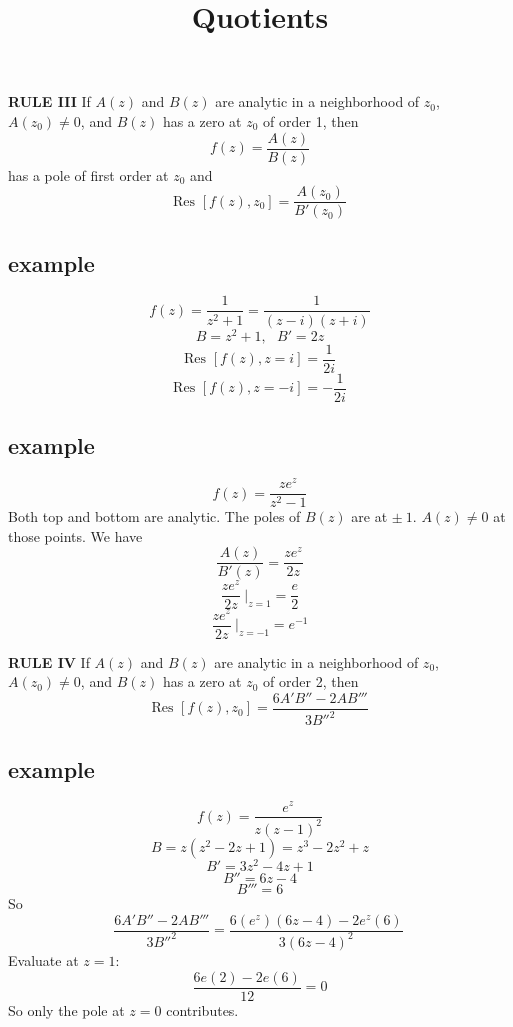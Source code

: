 \documentclass[11pt, oneside]{article}
\title{Quotients}
\date{}
\begin{document}
\maketitle
\Large


\textbf{RULE III}  If $A(z)$ and $B(z)$ are analytic in a neighborhood of $z_0$, $A(z_0) \ne 0$, and $B(z)$ has a zero at $z_0$ of order 1, then
\[ f(z) = \frac{A(z)}{B(z)} \]
has a pole of first order at $z_0$ and
\[ \text{Res } [f(z),z_0] = \frac{A(z_0)}{B'(z_0)} \]
\subsection*{example}
\[ f(z) = \frac{1}{z^2 + 1} = \frac{1}{(z - i)(z + i)} \]
\[ B = z^2 + 1, \ \ \ B' = 2z \]
\[ \text{Res } [f(z),z=i] = \frac{1}{2i} \]
\[ \text{Res } [f(z),z=-i] = -\frac{1}{2i} \]

\subsection*{example}
\[ f(z) = \frac{z e^z}{z^2 - 1} \]
Both top and bottom are analytic.  The poles of $B(z)$ are at $\pm \ 1$.  $A(z) \ne 0$ at those points.  We have 
\[ \frac{A(z)}{B'(z)} = \frac{z e^z}{2z} \]
\[ \frac{z e^z}{2z} \ \bigg |_{z=1} = \frac{e}{2} \]
\[ \frac{z e^z}{2z} \ \bigg |_{z=-1} = e^{-1} \]

\textbf{RULE IV}  If $A(z)$ and $B(z)$ are analytic in a neighborhood of $z_0$, $A(z_0) \ne 0$, and $B(z)$ has a zero at $z_0$ of order 2, then
\[ \text{Res } [f(z),z_0] = \frac{6A' B'' - 2AB'''}{3B''^2} \]

\subsection*{example}
\[ f(z) = \frac{e^z}{z(z-1)^2} \]
\[ B = z(z^2 - 2z + 1) = z^3 - 2z^2 + z \]
\[ B' = 3z^2 - 4z + 1 \]
\[ B'' = 6z - 4 \]
\[ B''' = 6 \]
So
\[ \frac{6A' B'' - 2AB'''}{3B''^2} = \frac{6(e^z)(6z-4) - 2e^z(6)}{3(6z-4)^2} \ \]
Evaluate at $z=1$:
\[ \frac{6e(2) - 2e(6)}{12} = 0 \]
So only the pole at $z=0$ contributes.
\end{document}
